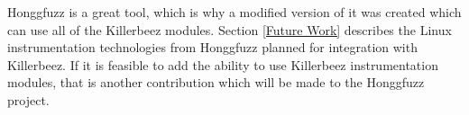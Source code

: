 Honggfuzz is a great tool, which is why a modified version of it was created
which can use all of the Killerbeez modules.\cite{honggfuzzgrimm} Section
\ref{Future Work} describes the Linux instrumentation technologies from
Honggfuzz planned for integration with Killerbeez.
If it is feasible to add the ability to use
Killerbeez instrumentation modules, that is another contribution which will be
made to the Honggfuzz project.
